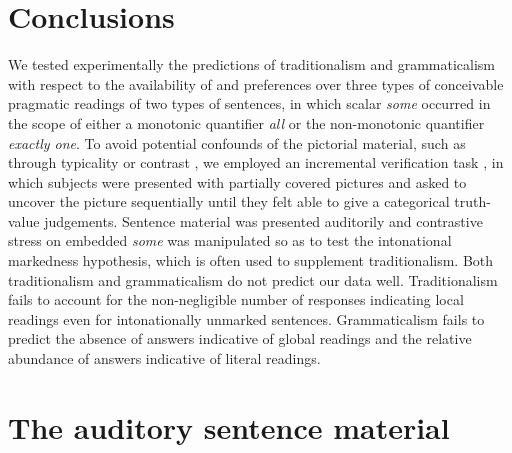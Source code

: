 \documentclass[fleqn,reqno,10pt,draft]{article}
\begin{document}
\section{Conclusions}
\label{sec:conclusions}

We tested experimentally the predictions of traditionalism and
grammaticalism with respect to the availability of and preferences
over three types of conceivable pragmatic readings of two types of
sentences, in which scalar \emph{some} occurred in the scope of either
a monotonic quantifier \emph{all} or the non-monotonic quantifier
\emph{exactly one}. To avoid potential confounds of the pictorial
material, such as through typicality or contrast
\citep{Tielvan-Tiel2012:Embedded-Scalar,GeurtsTielvan-Tiel2013:Scalar-expressi},
we employed an incremental verification task \citep{Conroy2008}, in
which subjects were presented with partially covered pictures and
asked to uncover the picture sequentially until they felt able to give
a categorical truth-value judgements. Sentence material was presented
auditorily and contrastive stress on embedded \emph{some} was
manipulated so as to test the intonational markedness hypothesis,
which is often used to supplement traditionalism. Both traditionalism
and grammaticalism do not predict our data well.  Traditionalism fails
to account for the non-negligible number of responses indicating local
readings even for intonationally unmarked sentences. Grammaticalism
fails to predict the absence of answers indicative of global readings
and the relative abundance of answers indicative of literal readings.



\newpage

\appendix

\section{The auditory sentence material}
\label{sec:audit-sent-mater}
\end{document}

